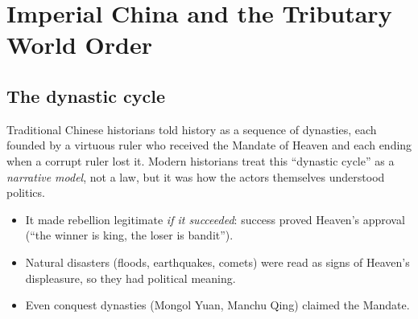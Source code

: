 \chapter{Imperial China and the Tributary World Order}

\section{The dynastic cycle}

Traditional Chinese historians told history as a sequence of dynasties, each founded by a
virtuous ruler who received the Mandate of Heaven and each ending when a corrupt ruler lost
it. Modern historians treat this ``dynastic cycle'' as a \emph{narrative model}, not a law,
but it was how the actors themselves understood politics.

\begin{center}
\end{center}

\begin{important}
\begin{itemize}
  \item It made rebellion legitimate \emph{if it succeeded}: success proved Heaven's
        approval (``the winner is king, the loser is bandit'').
  \item Natural disasters (floods, earthquakes, comets) were read as signs of Heaven's
        displeasure, so they had political meaning.
  \item Even conquest dynasties (Mongol Yuan, Manchu Qing) claimed the Mandate.
\end{itemize}
\end{important}

